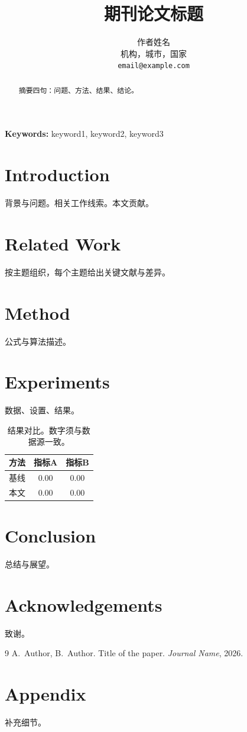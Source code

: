 \documentclass[11pt]{article}
\title{期刊论文标题}
\author{作者姓名 \\ 机构，城市，国家 \\ \texttt{email@example.com}}
\date{}
\begin{document}
\maketitle

\begin{abstract}
摘要四句：问题、方法、结果、结论。
\end{abstract}

\noindent\textbf{Keywords:} keyword1, keyword2, keyword3

\section{Introduction}
\label{sec:intro}
背景与问题。相关工作线索。本文贡献。

\section{Related Work}
\label{sec:related}
按主题组织，每个主题给出关键文献与差异。

\section{Method}
\label{sec:method}
公式与算法描述。

\section{Experiments}
\label{sec:experiments}
数据、设置、结果。

\begin{table}[htbp]
\centering
\begin{tabular}{lcc}
\toprule
方法 & 指标A & 指标B \\
\midrule
基线 & 0.00 & 0.00 \\
本文 & 0.00 & 0.00 \\
\bottomrule
\end{tabular}
\caption{结果对比。数字须与数据源一致。}
\label{tab:results}
\end{table}

\section{Conclusion}
\label{sec:conclusion}
总结与展望。

\section*{Acknowledgements}
致谢。

% 
% 
\begin{thebibliography}{9}
 A.~Author, B.~Author. Title of the paper. \textit{Journal Name}, 2026.
\end{thebibliography}

\appendix
\section{Appendix}
\label{app:detail}
补充细节。
\end{document}

